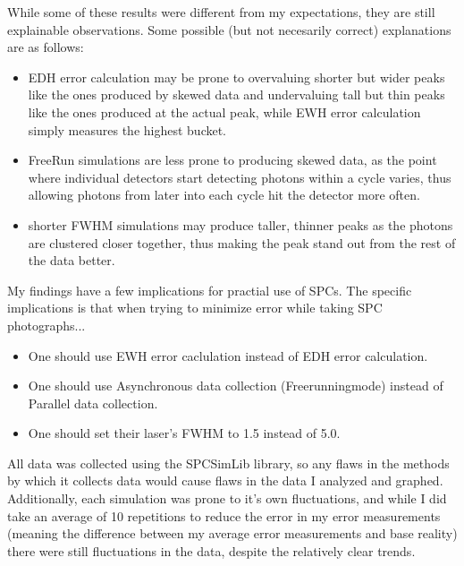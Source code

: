 \documentclass{beamer}
\begin{document}
\begin{frame}
  While some of these results were different from my expectations, they are still explainable observations. Some possible (but not necesarily correct) explanations are as follows:
  \begin{itemize}
  \item EDH error calculation may be prone to overvaluing shorter but wider peaks like the ones produced by skewed data and undervaluing tall but thin peaks like the ones produced at the actual peak, while EWH error calculation simply measures the highest bucket.
  \item FreeRun simulations are less prone to producing skewed data, as the point where individual detectors start detecting photons within a cycle varies, thus allowing photons from later into each cycle hit the detector more often.
  \item shorter FWHM simulations may produce taller, thinner peaks as the photons are clustered closer together, thus making the peak stand out from the rest of the data better.
  \end{itemize}
\end{frame}

\begin{frame}
  My findings have a few implications for practial use of SPCs. The specific implications is that when trying to minimize error while taking SPC photographs...
  \begin{itemize}
  \item One should use EWH error caclulation instead of EDH error calculation.
  \item One should use Asynchronous data collection (Freerunningmode) instead of Parallel data collection.
  \item One should set their laser's FWHM to 1.5 instead of 5.0.
  \end{itemize}
\end{frame}

\begin{frame}
\end{frame}

\begin{frame}
  All data was collected using the SPCSimLib library, so any flaws in the methods by which it collects data would cause flaws in the data I analyzed and graphed. Additionally, each simulation was prone to it's own fluctuations, and while I did take an average of 10 repetitions to reduce the error in my error measurements (meaning the difference between my average error measurements and base reality) there were still fluctuations in the data, despite the relatively clear trends.
\end{frame}
\end{document}
